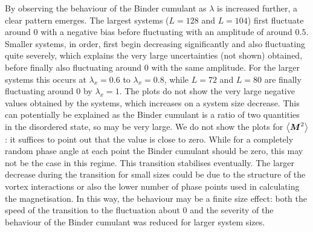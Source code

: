 By observing the behaviour of the Binder cumulant as $\lambda$ is increased further, a clear pattern emerges. The largest systems ($L=128$ and $L=104$) first fluctuate around 0 with a negative bias before fluctuating with an amplitude of around $0.5$. Smaller systems, in order, first begin decreasing significantly and also fluctuating quite severely, which explains the very large uncertainties (not shown) obtained, before finally also fluctuating around 0 with the same amplitude. For the larger systems this occurs at $\lambda_x=0.6$ to $\lambda_x=0.8$, while $L=72$ and $L=80$ are finally fluctuating around 0 by $\lambda_x=1$. The plots do not show the very large negative values obtained by the systems, which increases on a system size decrease. This can potentially be explained as the Binder cumulant is a ratio of two quantities in the disordered state, so may be very large. We do not show the plots for $\left < \boldsymbol{M}^2 \right >$: it suffices to point out that the value is close to zero. While for a completely random phase angle at each point the Binder cumulant should be zero, this may not be the case in this regime. This transition stabilises eventually. The larger decrease during the transition for small sizes could be due to the structure of the vortex interactions or also the lower number of phase points used in calculating the magnetisation. In this way, the behaviour may be a finite size effect: both the speed of the transition to the fluctuation about 0 and the severity of the behaviour of the Binder cumulant was reduced for larger system sizes. 

